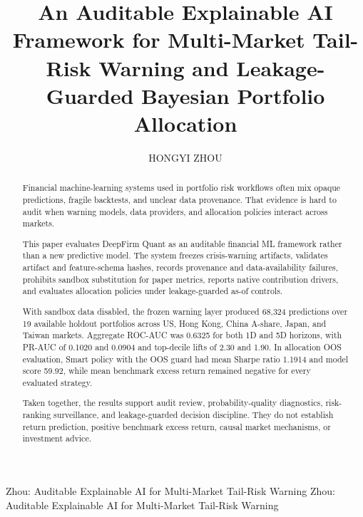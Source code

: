 \documentclass{ieeeaccess}
\begin{document}


\title{An Auditable Explainable AI Framework for Multi-Market Tail-Risk Warning and Leakage-Guarded Bayesian Portfolio Allocation}

\author{\uppercase{Hongyi Zhou}}
\address[1]{School of Professional Education and Executive Development, The Hong Kong Polytechnic University, Hong Kong (e-mail: p9112288@gmail.com)}
\markboth
{Zhou: Auditable Explainable AI for Multi-Market Tail-Risk Warning}
{Zhou: Auditable Explainable AI for Multi-Market Tail-Risk Warning}

\begin{abstract}
Financial machine-learning systems used in portfolio risk workflows often mix opaque predictions, fragile backtests, and unclear data provenance. That evidence is hard to audit when warning models, data providers, and allocation policies interact across markets.

This paper evaluates DeepFirm Quant as an auditable financial ML framework rather than a new predictive model. The system freezes crisis-warning artifacts, validates artifact and feature-schema hashes, records provenance and data-availability failures, prohibits sandbox substitution for paper metrics, reports native contribution drivers, and evaluates allocation policies under leakage-guarded as-of controls.

With sandbox data disabled, the frozen warning layer produced 68,324 predictions over 19 available holdout portfolios across US, Hong Kong, China A-share, Japan, and Taiwan markets. Aggregate ROC-AUC was 0.6325 for both 1D and 5D horizons, with PR-AUC of 0.1020 and 0.0904 and top-decile lifts of 2.30 and 1.90. In allocation OOS evaluation, Smart policy with the OOS guard had mean Sharpe ratio 1.1914 and model score 59.92, while mean benchmark excess return remained negative for every evaluated strategy.

Taken together, the results support audit review, probability-quality diagnostics, risk-ranking surveillance, and leakage-guarded decision discipline. They do not establish return prediction, positive benchmark excess return, causal market mechanisms, or investment advice.
\end{abstract}
\end{document}

